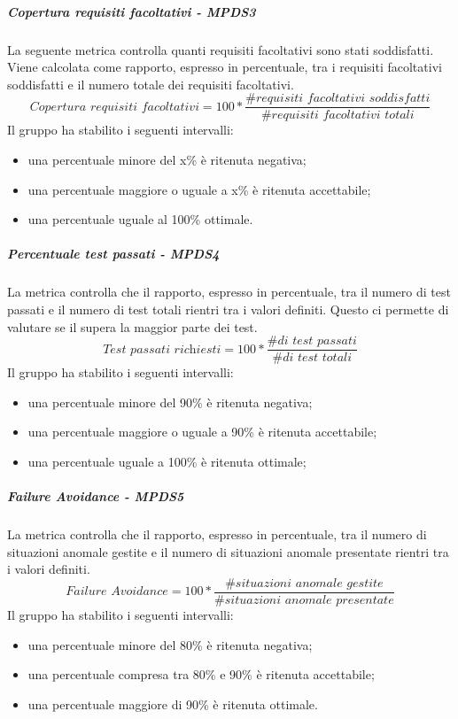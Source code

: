 \documentclass[PianoDiQualifica.tex]{subfiles}
\begin{document}
							\hypertarget{req_facoltativi}{\subparagraph{Copertura requisiti facoltativi - MPDS3}}
				La seguente metrica controlla quanti requisiti facoltativi sono stati soddisfatti. Viene calcolata come rapporto, espresso in percentuale, tra i requisiti facoltativi soddisfatti e
				il numero totale dei requisiti facoltativi. \\
				\begin{equation}\textit{Copertura requisiti facoltativi} = 100 * \frac{\textit{\#requisiti facoltativi soddisfatti}}{\textit{\#requisiti facoltativi totali}}\end{equation}
				Il gruppo ha stabilito i seguenti intervalli:
				\begin{itemize}
					\item una percentuale minore del x\% è ritenuta negativa;
					\item una percentuale maggiore o uguale a x\% è ritenuta accettabile;
					\item una percentuale uguale al 100\% ottimale.
				\end{itemize}
				
				
				\hypertarget{test_passati}{\subparagraph{Percentuale test passati  - MPDS4}}
				La metrica controlla che il rapporto, espresso in percentuale, tra il numero di test passati e il numero di test totali rientri tra i valori definiti. Questo ci permette
				di valutare se il  supera la maggior parte dei test. \\
				\begin{equation}\textit{Test passati richiesti} = 100 * \frac{\textit{\# di test passati}}{\textit{\# di test totali}}\end{equation}
				Il gruppo ha stabilito i seguenti intervalli:
				\begin{itemize}
					\item una percentuale minore del 90\% è ritenuta negativa;
					\item una percentuale maggiore o uguale a 90\% è ritenuta accettabile;
					\item una percentuale uguale a 100\% è ritenuta ottimale;
				\end{itemize}
				
				\hypertarget{failure}{\subparagraph{Failure Avoidance - MPDS5}}
				La metrica controlla che il rapporto, espresso in percentuale, tra il numero di situazioni anomale gestite e il numero di situazioni anomale presentate rientri tra i valori definiti.
				\begin{equation}\textit{Failure Avoidance} = 100 * \frac{\textit{\# situazioni anomale gestite}}{\textit{\# situazioni anomale presentate}}\end{equation}
				Il gruppo ha stabilito i seguenti intervalli:
				\begin{itemize}
					\item una percentuale minore del 80\% è ritenuta negativa;
					\item una percentuale compresa tra 80\% e 90\% è ritenuta accettabile;
					\item una percentuale maggiore di 90\% è ritenuta ottimale.
				\end{itemize}
				
\end{document}
